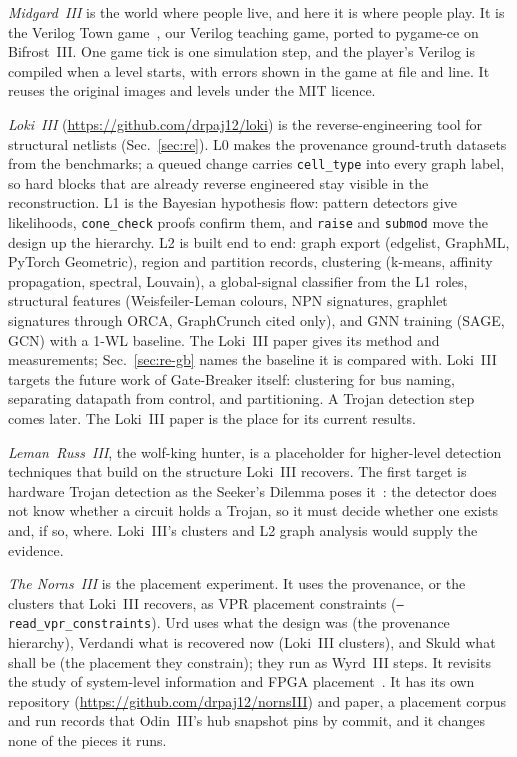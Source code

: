 \documentclass[conference]{IEEEtran}
\newcommand{\code}[1]{\texttt{#1}}
\begin{document}
\emph{Midgard~III} is the world where people live, and here it is where people play. It is the Verilog
Town game~, our Verilog teaching game, ported to pygame-ce on Bifrost~III. One
game tick is one simulation step, and the player's Verilog is compiled when a level starts, with
errors shown in the game at file and line. It reuses the original images and levels under the
MIT licence.

\emph{Loki~III} (\url{https://github.com/drpaj12/loki}) is the reverse-engineering tool for
structural netlists (Sec.~\ref{sec:re}). L0 makes the provenance ground-truth datasets from the
benchmarks; a queued change carries \code{cell\_type} into every graph label, so hard blocks that
are already reverse engineered stay visible in the reconstruction. L1 is the Bayesian hypothesis
flow: pattern detectors give likelihoods, \code{cone\_check} proofs confirm them, and \code{raise}
and \code{submod} move the design up the hierarchy. L2 is built end to end: graph export
(edgelist, GraphML, PyTorch Geometric), region and partition records, clustering (k-means,
affinity propagation, spectral, Louvain), a global-signal classifier from the L1 roles, structural
features (Weisfeiler-Leman colours, NPN signatures, graphlet signatures through ORCA, GraphCrunch
cited only), and GNN training (SAGE, GCN) with a 1-WL baseline. The Loki~III paper gives its method and measurements; Sec.~\ref{sec:re-gb} names the baseline it is compared with. Loki~III targets the future work of
Gate-Breaker itself: clustering for bus naming, separating datapath from control, and
partitioning. A Trojan detection step comes later. The Loki~III paper is the place for its current results.

\emph{Leman~Russ~III}, the wolf-king hunter, is a placeholder for higher-level detection techniques
that build on the structure Loki~III recovers. The first target is hardware Trojan detection as the
Seeker's Dilemma poses it~: the detector does not know whether a circuit
holds a Trojan, so it must decide whether one exists and, if so, where. Loki~III's clusters and L2
graph analysis would supply the evidence.

\emph{The Norns~III} is the placement experiment. It uses the provenance, or the clusters that
Loki~III recovers, as VPR placement constraints (\code{--read\_vpr\_constraints}). Urd uses what the
design was (the provenance hierarchy), Verdandi what is recovered now (Loki~III clusters), and Skuld
what shall be (the placement they constrain); they run as Wyrd~III steps. It revisits the study of
system-level information and FPGA
placement~. It has its own repository
(\url{https://github.com/drpaj12/nornsIII}) and paper, a placement corpus and run records that
Odin~III's hub snapshot pins by commit, and it changes none of the pieces it runs.
\end{document}
